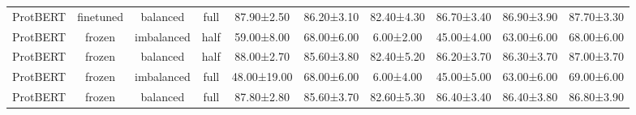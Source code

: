 \begin{tabular}{lccccccccc}
    ProtBERT &      finetuned &   balanced &      full &  87.90±2.50 &  86.20±3.10 & 82.40±4.30 & 86.70±3.40 &  86.90±3.90 &  87.70±3.30 \\
    ProtBERT &         frozen & imbalanced &      half &  59.00±8.00 &  68.00±6.00 &  6.00±2.00 & 45.00±4.00 &  63.00±6.00 &  68.00±6.00 \\
    ProtBERT &         frozen &   balanced &      half &  88.00±2.70 &  85.60±3.80 & 82.40±5.20 & 86.20±3.70 &  86.30±3.70 &  87.00±3.70 \\
    ProtBERT &         frozen & imbalanced &      full & 48.00±19.00 &  68.00±6.00 &  6.00±4.00 & 45.00±5.00 &  63.00±6.00 &  69.00±6.00 \\
    ProtBERT &         frozen &   balanced &      full &  87.80±2.80 &  85.60±3.70 & 82.60±5.30 & 86.40±3.40 &  86.40±3.80 &  86.80±3.90 \\
\bottomrule
\end{tabular}
